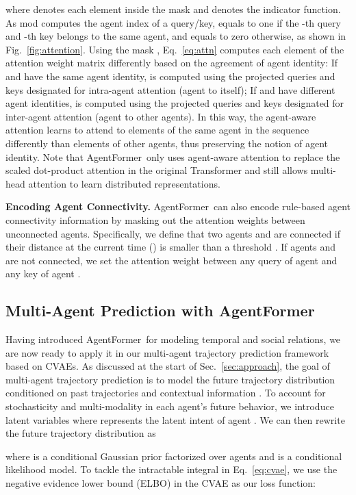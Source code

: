 \documentclass[10pt,twocolumn,letterpaper]{article}
\newcommand{\mname}{AgentFormer}
\begin{document}
where  denotes each element inside the mask  and  denotes the indicator function. As  mod  computes the agent index of a query/key,  equals to one if the -th query  and -th key  belongs to the same agent, and  equals to zero otherwise, as shown in Fig.~\ref{fig:attention}. Using the mask , Eq.~\eqref{eq:attn} computes each element  of the attention weight matrix  differently based on the agreement of agent identity: If  and  have the same agent identity,  is computed using the projected queries  and keys  designated for intra-agent attention (agent to itself); If  and  have different agent identities,  is computed using the projected queries  and keys  designated for inter-agent attention (agent to other agents). In this way, the agent-aware attention learns to attend to elements of the same agent in the sequence differently than elements of other agents, thus preserving the notion of agent identity. Note that \mname\ only uses agent-aware attention to replace the scaled dot-product attention in the original Transformer and still allows multi-head attention to learn distributed representations.

\vspace{2mm}
\noindent\textbf{Encoding Agent Connectivity.}
\mname\ can also encode rule-based agent connectivity information by masking out the attention weights between unconnected agents. Specifically, we define that two agents  and  are connected if their distance  at the current time () is smaller than a threshold . If agents  and  are not connected, we set the attention weight  between any query  of agent  and any key  of agent .

\subsection{Multi-Agent Prediction with \mname}
\label{sec:cvae}
Having introduced \mname\ for modeling temporal and social relations, we are now ready to apply it in our multi-agent trajectory prediction framework based on CVAEs. As discussed at the start of Sec.~\ref{sec:approach}, the goal of multi-agent trajectory prediction is to model the future trajectory distribution  conditioned on past trajectories  and contextual information . To account for stochasticity and multi-modality in each agent's future behavior, we introduce latent variables  where  represents the latent intent of agent . We can then rewrite the future trajectory distribution as
\vspace{-1mm}

where  is a conditional Gaussian prior factorized over agents and  is a conditional likelihood model. To tackle the intractable integral in Eq.~\eqref{eq:cvae}, we use the negative evidence lower bound (ELBO)  in the CVAE as our loss function:
\end{document}
